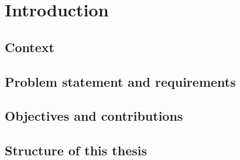 \chapter{Introduction}
\label{chapter:introduction}

\section{Context}

\section{Problem statement and requirements}

\section{Objectives and contributions}

\section{Structure of this thesis}
